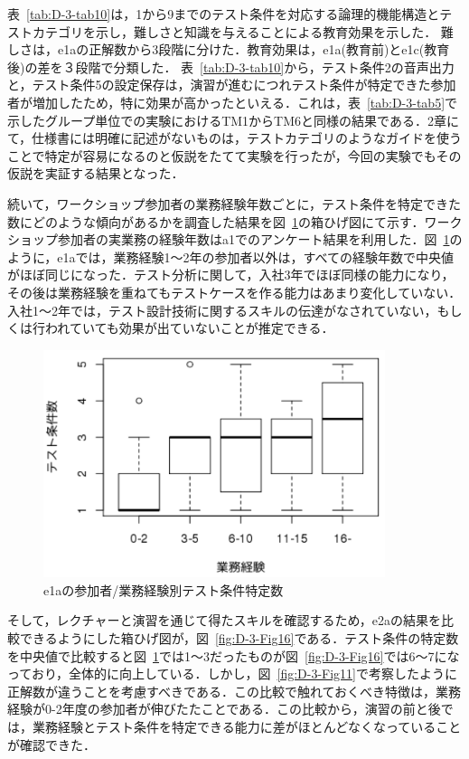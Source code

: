 表~\ref{tab:D-3-tab10}は，1から9までのテスト条件を対応する論理的機能構造とテストカテゴリを示し，難しさと知識を与えることによる教育効果を示した．
難しさは，e1aの正解数から3段階に分けた．教育効果は，e1a(教育前)とe1c(教育後)の差を３段階で分類した．
表~\ref{tab:D-3-tab10}から，テスト条件2の音声出力と，テスト条件5の設定保存は，演習が進むにつれテスト条件が特定できた参加者が増加したため，特に効果が高かったといえる．これは，表~\ref{tab:D-3-tab5}で示したグループ単位での実験におけるTM1からTM6と同様の結果である．2章にて，仕様書には明確に記述がないものは，テストカテゴリのようなガイドを使うことで特定が容易になるのと仮説をたてて実験を行ったが，今回の実験でもその仮説を実証する結果となった．

続いて，ワークショップ参加者の業務経験年数ごとに，テスト条件を特定できた数にどのような傾向があるかを調査した結果を図~\ref{fig:D-3-Fig15}の箱ひげ図にて示す．ワークショップ参加者の実業務の経験年数はa1でのアンケート結果を利用した．図~\ref{fig:D-3-Fig15}のように，e1aでは，業務経験1～2年の参加者以外は，すべての経験年数で中央値がほぼ同じになった．テスト分析に関して，入社3年でほぼ同様の能力になり，その後は業務経験を重ねてもテストケースを作る能力はあまり変化していない．
入社1～2年では，テスト設計技術に関するスキルの伝達がなされていない，もしくは行われていても効果が出ていないことが推定できる．
\begin{figure}[htbp]
  \begin{center}
  \includegraphics[width=10cm]{./image/D-3-Fig15.png}
  \caption{e1aの参加者/業務経験別テスト条件特定数}
  \label{fig:D-3-Fig15}
  \end{center}
\end{figure}

そして，レクチャーと演習を通じて得たスキルを確認するため，e2aの結果を比較できるようにした箱ひげ図が，図~\ref{fig:D-3-Fig16}である．テスト条件の特定数を中央値で比較すると図~\ref{fig:D-3-Fig15}では1〜3だったものが図~\ref{fig:D-3-Fig16}では6〜7になっており，全体的に向上している．しかし，図~\ref{fig:D-3-Fig11}で考察したように正解数が違うことを考慮すべきである．この比較で触れておくべき特徴は，業務経験が0-2年度の参加者が伸びたたことである．この比較から，演習の前と後では，業務経験とテスト条件を特定できる能力に差がほとんどなくなっていることが確認できた．

